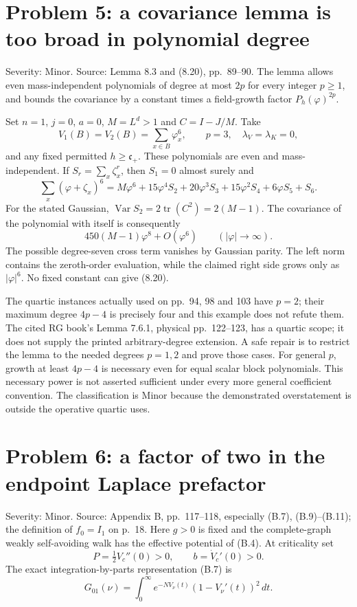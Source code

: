\documentclass[10pt]{article}
\begin{document}
\section*{Problem 5: a covariance lemma is too broad in polynomial degree}
Severity: Minor. Source: Lemma 8.3 and (8.20), pp. 89–90. The lemma allows even mass-independent polynomials of degree at most \(2p\) for every integer \(p\geq1\), and bounds the covariance by a constant times a field-growth factor \(P_h(\varphi)^{2p}\).\par
Set \(n=1\), \(j=0\), \(a=0\), \(M=L^d>1\) and \(C=I-J/M\). Take \[V_1(B)=V_2(B)=\sum_{x\in B}\varphi_x^6,\qquad p=3,
 \quad \lambda_V=\lambda_K=0,\] and any fixed permitted \(h\geq\mathfrak c_+\). These polynomials are even and mass-independent. If \(S_r=\sum_x\zeta_x^r\), then \(S_1=0\) almost surely and \[\sum_x(\varphi+\zeta_x)^6
 =M\varphi^6+15\varphi^4 S_2+20\varphi^3 S_3
               +15\varphi^2 S_4+6\varphi S_5+S_6 .\] For the stated Gaussian, \(\operatorname{Var}S_2=2\operatorname{tr}(C^2)=2(M-1)\). The covariance of the polynomial with itself is consequently \[450(M-1)\varphi^8+O(\varphi^6)
       \qquad (|\varphi|\to\infty).\] The possible degree-seven cross term vanishes by Gaussian parity. The left norm contains the zeroth-order evaluation, while the claimed right side grows only as \(|\varphi|^6\). No fixed constant can give (8.20).\par
The quartic instances actually used on pp. 94, 98 and 103 have \(p=2\); their maximum degree \(4p-4\) is precisely four and this example does not refute them. The cited RG book’s Lemma 7.6.1, physical pp. 122–123, has a quartic scope; it does not supply the printed arbitrary-degree extension. A safe repair is to restrict the lemma to the needed degrees \(p=1,2\) and prove those cases. For general \(p\), growth at least \(4p-4\) is necessary even for equal scalar block polynomials. This necessary power is not asserted sufficient under every more general coefficient convention. The classification is Minor because the demonstrated overstatement is outside the operative quartic uses.\par
\section*{Problem 6: a factor of two in the endpoint Laplace prefactor}
Severity: Minor. Source: Appendix B, pp. 117–118, especially (B.7), (B.9)–(B.11); the definition of \(f_0=I_1\) on p. 18. Here \(g>0\) is fixed and the complete-graph weakly self-avoiding walk has the effective potential of (B.4). At criticality set \[P=\tfrac12 V_c''(0)>0,\qquad b=\dot V_c'(0)>0.\] The exact integration-by-parts representation (B.7) is \[G_{01}(\nu)=\int_0^\infty e^{-NV_\nu(t)}(1-V_\nu'(t))^2\,dt .\]\par
\end{document}
